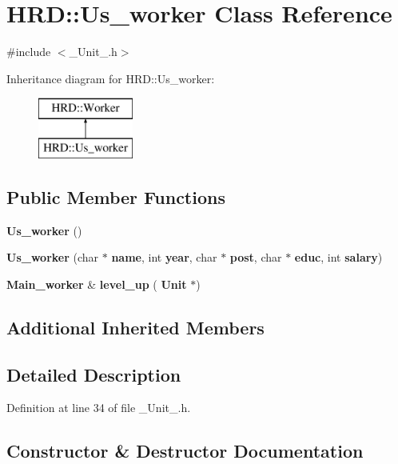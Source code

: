 \section{H\+RD\+:\+:Us\+\_\+worker Class Reference}
\label{class_h_r_d_1_1_us__worker}


{\ttfamily \#include $<$\+\_\+\+Unit\+\_\+.\+h$>$}

Inheritance diagram for H\+RD\+:\+:Us\+\_\+worker\+:\begin{figure}[H]
\begin{center}
\leavevmode
\includegraphics[height=2.000000cm]{class_h_r_d_1_1_us__worker}
\end{center}
\end{figure}
\subsection*{Public Member Functions}
\begin{DoxyCompactItemize}
\item 
\textbf{ Us\+\_\+worker} ()
\item 
\textbf{ Us\+\_\+worker} (char $\ast$\textbf{ name}, int \textbf{ year}, char $\ast$\textbf{ post}, char $\ast$\textbf{ educ}, int \textbf{ salary})
\item 
\textbf{ Main\+\_\+worker} \& \textbf{ level\+\_\+up} (\textbf{ Unit} $\ast$)
\end{DoxyCompactItemize}
\subsection*{Additional Inherited Members}


\subsection{Detailed Description}


Definition at line 34 of file \+\_\+\+Unit\+\_\+.\+h.



\subsection{Constructor \& Destructor Documentation}
\mbox{\label{class_h_r_d_1_1_us__worker_a7e0c8b11ec80568a7905abd13b4681f5}} 
